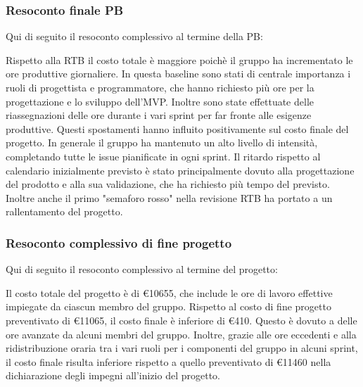 \subsubsection{Resoconto finale PB}
Qui di seguito il resoconto complessivo al termine della PB:



\noindent Rispetto alla RTB il costo totale è maggiore poichè il gruppo ha incrementato le ore produttive giornaliere.
In questa baseline sono stati di centrale importanza i ruoli di progettista e programmatore, che hanno richiesto più ore per la progettazione e lo sviluppo dell'MVP.
Inoltre sono state effettuate delle riassegnazioni delle ore durante i vari sprint per far fronte alle esigenze produttive. Questi spostamenti hanno influito positivamente sul costo finale del progetto.
In generale il gruppo ha mantenuto un alto livello di intensità, completando tutte le issue pianificate in ogni sprint. 
Il ritardo rispetto al calendario inizialmente previsto è stato principalmente dovuto alla progettazione del prodotto e alla sua validazione, che ha richiesto più tempo del previsto. Inoltre anche il primo "semaforo rosso" nella revisione RTB ha portato a un rallentamento del progetto.

\pagebreak

\subsubsection{Resoconto complessivo di fine progetto}
Qui di seguito il resoconto complessivo al termine del progetto:



\noindent Il costo totale del progetto è di \euro{10655}, che include le ore di lavoro effettive impiegate da ciascun membro del gruppo.
Rispetto al costo di fine progetto preventivato di \euro{11065}, il costo finale è inferiore di \euro{410}. Questo è dovuto a delle ore avanzate da alcuni membri del gruppo.
Inoltre, grazie alle ore eccedenti e alla ridistribuzione oraria tra i vari ruoli per i componenti del gruppo in alcuni sprint, il costo finale risulta inferiore rispetto a quello preventivato di \euro{11460} nella dichiarazione degli impegni all'inizio del progetto.
